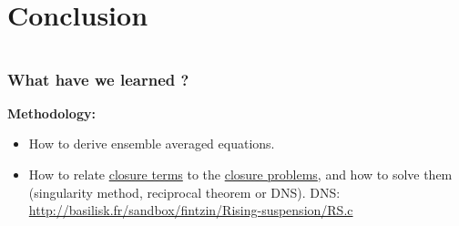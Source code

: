 \documentclass{sintefbeamer}
\begin{document}
\section{Conclusion}
\section*{}

\begin{frame}
  \frametitle{What have we learned ? }

\textbf{Methodology: }
  \begin{itemize}
    \item How to derive ensemble averaged equations. 
    \item How to relate \underline{closure terms} to the \underline{closure problems}, and how to solve them (singularity method, reciprocal theorem or DNS).
    DNS: \url{http://basilisk.fr/sandbox/fintzin/Rising-suspension/RS.c}
  \end{itemize}



\end{frame}
\end{document}
